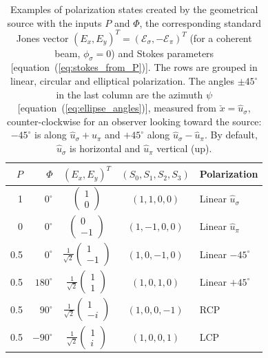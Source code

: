 \documentclass{iucr}
\begin{document}
\begin{table}
\centering
\caption{Examples of polarization states created by the geometrical source with the inputs $P$ and $\Phi$, the corresponding standard Jones vector $(E_x,E_y)^T=(\mathcal{E}_\sigma,-\mathcal{E}_\pi)^T$ (for a coherent beam, $\phi_\sigma=0$) and Stokes parameters [equation~(\ref{eq:stokes_from_P})]. The rows are grouped in linear, circular and elliptical polarization. The angles $\pm45^\circ$ in the last column are the azimuth $\psi$ [equation~(\ref{eq:ellipse_angles})], measured from $\check{x}=\hat{u}_\sigma$, counter-clockwise for an observer looking toward the source: $-45^\circ$ is along $\hat{u}_\sigma+\hat{u}_\pi$ and $+45^\circ$ along $\hat{u}_\sigma-\hat{u}_\pi$. By default, $\hat{u}_\sigma$ is horizontal and $\hat{u}_\pi$ vertical (up).}
\label{tab:source_polarization}
\footnotesize
\setlength{\tabcolsep}{2.5pt}
\renewcommand{\arraystretch}{1.5}
\begin{tabular}{rr c c l}
\hline
$P$ & $\Phi$ & $(E_x,E_y)^T$ & $(S_0,S_1,S_2,S_3)$ & Polarization \\
\hline
1 & $0^\circ$ & $\left(\begin{smallmatrix}1\\0\end{smallmatrix}\right)$ & $(1,1,0,0)$ & Linear $\hat{u}_\sigma$ \\
0 & $0^\circ$ & $\left(\begin{smallmatrix}0\\-1\end{smallmatrix}\right)$ & $(1,-1,0,0)$ & Linear $\hat{u}_\pi$ \\
0.5 & $0^\circ$ & $\frac{1}{\sqrt{2}}\left(\begin{smallmatrix}1\\-1\end{smallmatrix}\right)$ & $(1,0,-1,0)$ & Linear $-45^\circ$ \\
0.5 & $180^\circ$ & $\frac{1}{\sqrt{2}}\left(\begin{smallmatrix}1\\1\end{smallmatrix}\right)$ & $(1,0,1,0)$ & Linear $+45^\circ$ \\
\hline
0.5 & $90^\circ$ & $\frac{1}{\sqrt{2}}\left(\begin{smallmatrix}1\\-i\end{smallmatrix}\right)$ & $(1,0,0,-1)$ & RCP \\
0.5 & $-90^\circ$ & $\frac{1}{\sqrt{2}}\left(\begin{smallmatrix}1\\i\end{smallmatrix}\right)$ & $(1,0,0,1)$ & LCP \\

\end{tabular}
\end{table}
\end{document}

